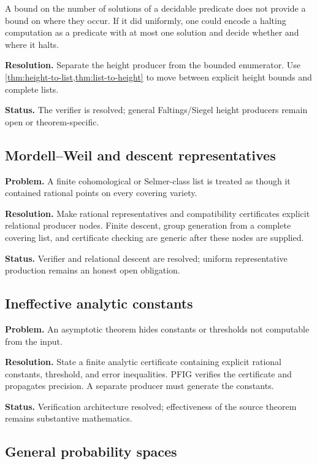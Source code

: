 \begin{barrier}
A bound on the number of solutions of a decidable predicate does not provide a bound on where they occur.  If it did uniformly, one could encode a halting computation as a predicate with at most one solution and decide whether and where it halts.
\end{barrier}

\textbf{Resolution.} Separate the height producer from the bounded enumerator.  Use \cref{thm:height-to-list,thm:list-to-height} to move between explicit height bounds and complete lists.

\textbf{Status.} The verifier is resolved; general Faltings/Siegel height producers remain open or theorem-specific.

\subsection{Mordell--Weil and descent representatives}

\textbf{Problem.} A finite cohomological or Selmer-class list is treated as though it contained rational points on every covering variety.

\textbf{Resolution.} Make rational representatives and compatibility certificates explicit relational producer nodes.  Finite descent, group generation from a complete covering list, and certificate checking are generic after these nodes are supplied.

\textbf{Status.} Verifier and relational descent are resolved; uniform representative production remains an honest open obligation.

\subsection{Ineffective analytic constants}

\textbf{Problem.} An asymptotic theorem hides constants or thresholds not computable from the input.

\textbf{Resolution.} State a finite analytic certificate containing explicit rational constants, threshold, and error inequalities.  PFIG verifies the certificate and propagates precision.  A separate producer must generate the constants.

\textbf{Status.} Verification architecture resolved; effectiveness of the source theorem remains substantive mathematics.

\subsection{General probability spaces}

